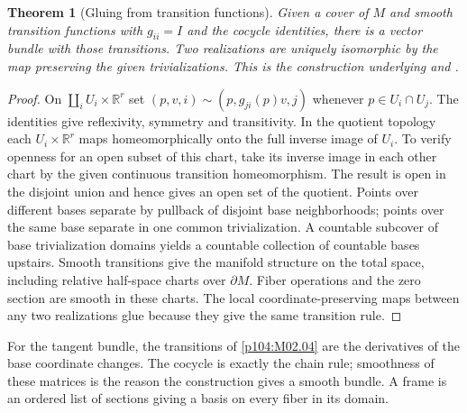 \documentclass[11pt,oneside,openany]{book}
\newtheorem{theorem}{Theorem}[chapter]
\theoremstyle{definition}
\theoremstyle{remark}
\newcommand{\R}{\mathbb R}
\begin{document}
\begin{theorem}[Gluing from transition functions]\label{p104:M05.01}
Given a cover of \(M\) and smooth transition functions with \(g_{ii}=I\) and the cocycle identities, there is a vector bundle with those transitions. Two realizations are uniquely isomorphic by the map preserving the given trivializations. This is the construction underlying \cite[Chapter 10 and Problem 10-6]{lee} and \cite[\S12]{tu}.
\end{theorem}
\begin{proof}
On \(\coprod_i U_i\times\R^r\) set \((p,v,i)\sim(p,g_{ji}(p)v,j)\) whenever \(p\in U_i\cap U_j\). The identities give reflexivity, symmetry and transitivity. In the quotient topology each \(U_i\times\R^r\) maps homeomorphically onto the full inverse image of \(U_i\). To verify openness for an open subset of this chart, take its inverse image in each other chart by the given continuous transition homeomorphism. The result is open in the disjoint union and hence gives an open set of the quotient. Points over different bases separate by pullback of disjoint base neighborhoods; points over the same base separate in one common trivialization. A countable subcover of base trivialization domains yields a countable collection of countable bases upstairs. Smooth transitions give the manifold structure on the total space, including relative half-space charts over \(\partial M\). Fiber operations and the zero section are smooth in these charts. The local coordinate-preserving maps between any two realizations glue because they give the same transition rule.
\end{proof}

For the tangent bundle, the transitions of \cref{p104:M02.04} are the derivatives of the base coordinate changes. The cocycle is exactly the chain rule; smoothness of these matrices is the reason the construction gives a smooth bundle. A frame is an ordered list of sections giving a basis on every fiber in its domain.
\end{document}
